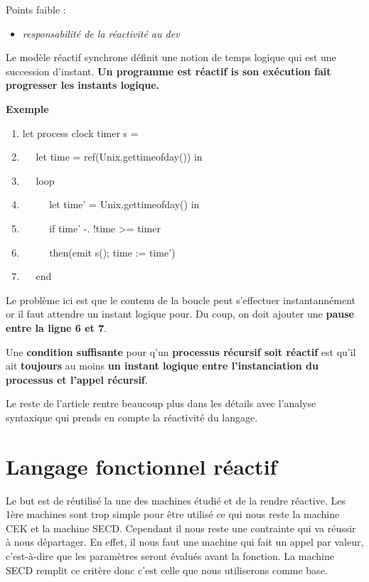 \documentclass[10pt,a4paper]{article}
\begin{document}
				Points faible : 
				\begin{itemize}
					\item \textit{\small{responsabilit\'{e} de la r\'{e}activit\'{e} au dev}}
				\end{itemize}
				\medbreak
					
				Le mod\`{e}le r\'{e}actif synchrone d\'{e}finit une notion de temps logique qui est une succession d'instant.
				\smallbreak
				\textbf{Un programme est r\'{e}actif is son ex\'{e}cution fait progresser les instants logique.}
				\medbreak
					
				\textbf{Exemple}
				\medbreak
					
				\begin{enumerate}
				 	\item let process clock timer s =
				 	\item $\quad$ let time = ref(Unix.gettimeofday()) in
				 	\item $\quad$ loop
				 	\item $\quad$ $\quad$ let time' = Unix.gettimeofday() in
				 	\item $\quad$ $\quad$ if time' -. !time >= timer
				 	\item $\quad$ $\quad$ then(emit s(); time := time')
				 	\item $\quad$ end 
			 	\end{enumerate}
				\medbreak
					
				Le probl\`{e}me ici est que le contenu de la boucle peut s'effectuer instantann\'{e}ment or il faut attendre un instant logique pour. Du coup, on doit ajouter une \textbf{pause entre la ligne 6 et 7}.
				\bigbreak
					
				Une \textbf{condition suffisante} pour q'un \textbf{processus r\'{e}cursif soit r\'{e}actif} est qu'il ait \textbf{toujours} au moins \textbf{un instant logique entre l'instanciation du processus et l'appel r\'{e}cursif}.
				\bigbreak
					
				Le reste de l'article rentre beaucoup plus dans les détails avec l'analyse syntaxique qui prends en compte la réactivité du langage.
			
				\newpage
			
			
			
	\section{Langage fonctionnel réactif}\label{SECDConc4}
			
		Le but est de réutilisé la une des machines étudié et de la rendre réactive. Les 1ère machines sont trop simple pour être utilisé ce qui nous reste la machine CEK et la machine SECD. Cependant il nous reste une contrainte qui va réussir à nous départager. En effet, il nous faut une machine qui fait un appel par valeur, c'est-à-dire que les paramètres seront évalués avant la fonction. La machine SECD remplit ce critère donc c'est celle que nous utiliserons comme base.
		\medbreak
			
\end{document}
